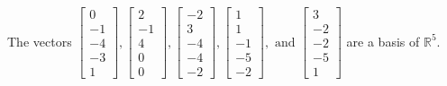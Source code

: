 \begin{exercise}
\begin{exerciseStatement}
  \end{exerciseStatement}
  \begin{exerciseAnswer}
   The vectors \(\left[\begin{array}{r}
0 \\
-1 \\
-4 \\
-3 \\
1
\end{array}\right] , \left[\begin{array}{r}
2 \\
-1 \\
4 \\
0 \\
0
\end{array}\right] , \left[\begin{array}{r}
-2 \\
3 \\
-4 \\
-4 \\
-2
\end{array}\right] , \left[\begin{array}{r}
1 \\
1 \\
-1 \\
-5 \\
-2
\end{array}\right] , \text{ and } \left[\begin{array}{r}
3 \\
-2 \\
-2 \\
-5 \\
1
\end{array}\right]\) 
  	 are  a basis of \(\mathbb{R}^5\).
  


  \end{exerciseAnswer}
\end{exercise}